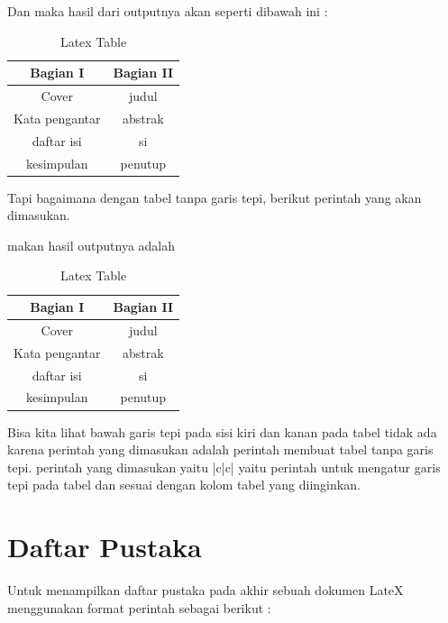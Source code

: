 Dan maka hasil dari outputnya akan seperti dibawah ini :

\begin{table}[h]
\caption{Latex Table}
\centering
\begin{tabular}{|c|c|}
\hline
\textbf{Bagian I}&\textbf{Bagian II}\\
\hline
Cover&judul\\
\hline
Kata pengantar&abstrak\\
\hline
daftar isi&si\\
\hline
kesimpulan&penutup\\
\hline
\end{tabular}
\label{table:permisalan}
\end{table}

Tapi bagaimana dengan tabel tanpa garis tepi, berikut perintah yang akan dimasukan.

 makan hasil outputnya adalah 

\begin{table}[h]
\caption{Latex Table}
\centering
\begin{tabular}{c|c}
\hline
\textbf{Bagian I}&\textbf{Bagian II}\\
\hline
Cover&judul\\
\hline
Kata pengantar&abstrak\\
\hline
daftar isi&si\\
\hline
kesimpulan&penutup\\
\hline
\end{tabular}
\label{table:permisalan}
\end{table}

Bisa kita lihat bawah garis tepi pada sisi kiri dan kanan pada tabel tidak ada karena perintah yang dimasukan adalah perintah membuat tabel tanpa garis tepi. perintah yang dimasukan yaitu |c|c| yaitu perintah untuk mengatur garis tepi pada tabel dan sesuai dengan kolom tabel yang diinginkan.

\section{Daftar Pustaka}
Untuk menampilkan daftar pustaka pada akhir sebuah dokumen LateX menggunakan format perintah sebagai berikut :
